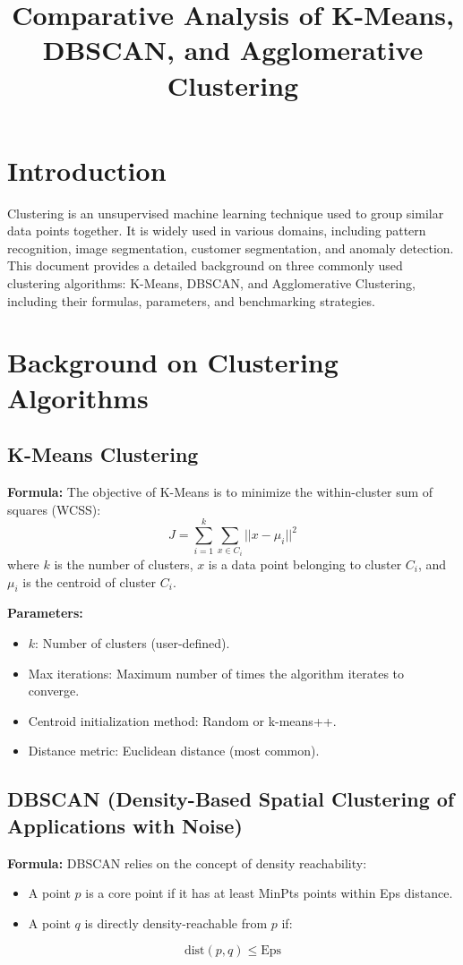 \documentclass{article}
\title{Comparative Analysis of K-Means, DBSCAN, and Agglomerative Clustering}
\author{}
\date{}
\begin{document}
\maketitle

\section{Introduction}
Clustering is an unsupervised machine learning technique used to group similar data points together. 
It is widely used in various domains, including pattern recognition, image segmentation, customer segmentation, 
and anomaly detection. This document provides a detailed background on three commonly used clustering algorithms: 
K-Means, DBSCAN, and Agglomerative Clustering, including their formulas, parameters, and benchmarking strategies.

\section{Background on Clustering Algorithms}

\subsection{K-Means Clustering}
\textbf{Formula:} The objective of K-Means is to minimize the within-cluster sum of squares (WCSS):
\begin{equation}
J = \sum_{i=1}^{k} \sum_{x \in C_i} ||x - \mu_i||^2
\end{equation}
where \( k \) is the number of clusters, \( x \) is a data point belonging to cluster \( C_i \), 
and \( \mu_i \) is the centroid of cluster \( C_i \).

\textbf{Parameters:}
\begin{itemize}
    \item \( k \): Number of clusters (user-defined).
    \item Max iterations: Maximum number of times the algorithm iterates to converge.
    \item Centroid initialization method: Random or k-means++.
    \item Distance metric: Euclidean distance (most common).
\end{itemize}

\subsection{DBSCAN (Density-Based Spatial Clustering of Applications with Noise)}
\textbf{Formula:} DBSCAN relies on the concept of density reachability:
\begin{itemize}
    \item A point \( p \) is a core point if it has at least MinPts points within Eps distance.
    \item A point \( q \) is directly density-reachable from \( p \) if:
\end{itemize}
\begin{equation}
\text{dist}(p, q) \leq \text{Eps}
\end{equation}
\end{document}
